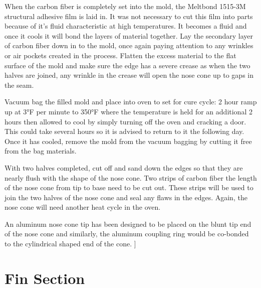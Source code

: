\documentclass{aiaa-tc}%
\begin{document}
When the carbon fiber is completely set into the mold, the Meltbond 1515-3M structural adhesive film is laid in. It was not necessary to cut this film into parts because of it's fluid characteristic at high temperatures. It becomes a fluid and once it cools it will bond the layers of material together. Lay the secondary layer of carbon fiber down in to the mold, once again paying attention to any wrinkles or air pockets created in the process. Flatten the excess material to the flat surface of the mold and make sure the edge has a severe crease as when the two halves are joined, any wrinkle in the crease will open the nose cone up to gaps in the seam.

Vacuum bag the filled mold and place into oven to set for cure cycle: 2 hour ramp up at 3°F per minute to 350°F where the temperature is held for an additional 2 hours then allowed to cool by simply turning off the oven and cracking a door. This could take several hours so it is advised to return to it the following day. Once it has cooled, remove the mold from the vacuum bagging by cutting it free from the bag materials. 

With two halves completed, cut off and sand down the edges so that they are nearly flush with the shape of the nose cone. Two strips of carbon fiber the length of the nose cone from tip to base need to be cut out. These strips will be used to join the two halves of the nose cone and seal any flaws in the edges. Again, the nose cone will need another heat cycle in the oven. 

An aluminum nose cone tip has been designed to be placed on the blunt tip end of the nose cone and similarly, the aluminum coupling ring would be co-bonded to the cylindrical shaped end of the cone. ]

\section{Fin Section}


\end{document}
